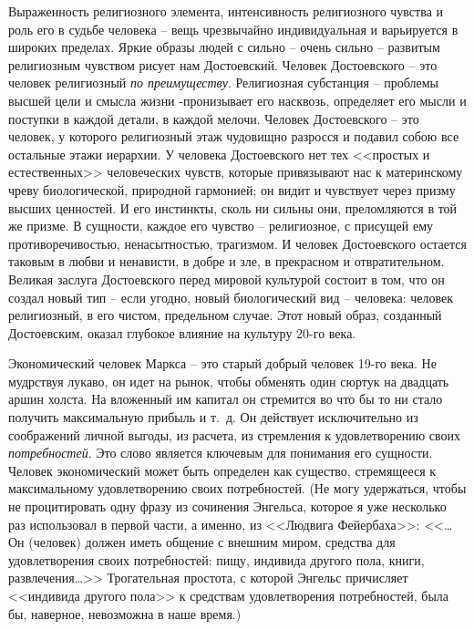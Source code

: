 \documentclass{book}
\begin{document}
Выраженность религиозного элемента, интенсивность рели­гиозного чувства и роль его в судьбе человека -- вещь чрезвы­чайно индивидуальная и варьируется в широких пределах. Яр­кие образы людей с сильно -- очень сильно -- развитым религи­озным чувством рисует нам Достоевский. Человек Достоев­ского -- это человек религиозный \textit{по преимуществу}.  Религиоз­ная субстанция -- проблемы высшей цели и смысла жизни -пронизывает его насквозь, определяет его мысли и поступки в каждой детали, в каждой мелочи. Человек Достоевского -- это человек, у которого религиозный этаж чудовищно разрос­ся и подавил собою все остальные этажи иерархии. У человека Достоевского нет тех <<простых и естественных>> человеческих чувств, которые привязывают нас к материнскому чреву био­логической, природной гармонией; он видит и чувствует через призму высших ценностей. И его инстинкты, сколь ни сильны они, преломляются в той же призме. В сущности, каждое его чувство -- религиозное, с присущей ему противоречивостью, ненасытностью, 
трагизмом. И 
человек 
Достоевского остается таковым в любви и ненависти, в добре и зле, в прекрасном и отвратительном. Великая заслуга Достоевского перед мировой культурой состоит в том, что он создал новый тип -- если угодно, новый биологический вид -- человека: человек религиозный, в его чистом, предельном случае. Этот новый образ, созданный Достоевским, оказал глубокое влияние на культуру 20-го века.

Экономический человек Маркса -- это старый добрый чело­век 19-го века. Не мудрствуя лукаво, он идет на рынок, чтобы обменять один сюртук на двадцать аршин холста. На вложен­ный им капитал он стремится во что бы то ни стало получить максимальную прибыль и т.~д. Он действует исключительно из соображений личной выгоды, из расчета, из стремления к удов­летворению своих \textit{потребностей}.  Это слово является ключевым для понимания его сущности. Человек экономический может быть определен как существо, стремящееся к максимальному удовлетворению своих потребностей. (Не могу удержаться, что­бы не процитировать одну фразу из сочинения Энгельса, кото­рое я уже несколько раз использовал в первой части, а именно, из <<Людвига Фейербаха>>: <<\ldots{}Он (человек) должен иметь обще­ние с внешним миром, средства для удовлетворения своих по­требностей: пищу, индивида другого пола, книги, развлече­ния\ldots>>%
Трогательная простота, с которой Энгельс причисляет <<индивида другого пола>> к средствам удовлетворения 
потреб­ностей, 
была бы, наверное, невозможна в наше время.)
\end{document}
